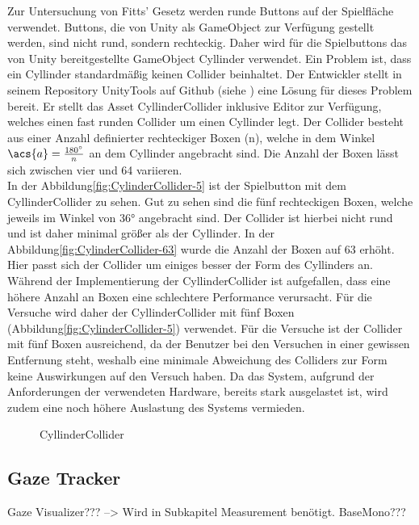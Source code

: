 Zur Untersuchung von Fitts' Gesetz werden runde Buttons auf der Spielfläche verwendet. Buttons, die von Unity als GameObject zur Verfügung gestellt werden, sind nicht rund, sondern rechteckig. Daher wird für die Spielbuttons das von Unity bereitgestellte GameObject {\ttfamily Cyllinder} verwendet. Ein Problem ist, dass ein Cyllinder standardmäßig keinen Collider beinhaltet. Der Entwickler \citeauthor{kode80.2016} stellt in seinem Repository UnityTools auf Github (siehe \cite{kode80.2016}) eine Lösung für dieses Problem bereit. Er stellt das Asset {\ttfamily CyllinderCollider} inklusive Editor zur Verfügung, welches einen fast runden Collider um einen Cyllinder legt. Der Collider besteht aus einer Anzahl definierter rechteckiger Boxen (n), welche in dem Winkel $\acs{a} = \frac{180^\circ}{n}$ an dem Cyllinder angebracht sind. Die Anzahl der Boxen lässt sich zwischen vier und 64 variieren.\\
In der Abbildung\autoref{fig:CylinderCollider-5} ist der Spielbutton mit dem CyllinderCollider zu sehen. Gut zu sehen sind die fünf rechteckigen Boxen, welche jeweils im Winkel von 36° angebracht sind. Der Collider ist hierbei nicht rund und ist daher minimal größer als der Cyllinder. In der Abbildung\autoref{fig:CylinderCollider-63} wurde die Anzahl der Boxen auf 63 erhöht. Hier passt sich der Collider um einiges besser der Form des Cyllinders an. Während der Implementierung der CyllinderCollider ist aufgefallen, dass eine höhere Anzahl an Boxen eine schlechtere Performance verursacht. Für die Versuche wird daher der CyllinderCollider mit fünf Boxen (Abbildung\autoref{fig:CylinderCollider-5}) verwendet. Für die Versuche ist der Collider mit fünf Boxen ausreichend, da der Benutzer bei den Versuchen in einer gewissen Entfernung steht, weshalb eine minimale Abweichung des Colliders zur Form keine Auswirkungen auf den Versuch haben. Da das System, aufgrund der Anforderungen der verwendeten Hardware, bereits stark ausgelastet ist, wird zudem eine noch höhere Auslastung des Systems vermieden.

\begin{figure}[!htbp]
	\centering
	\qquad      
	\caption{CyllinderCollider}
	\label{fig:CylinderCollider}
\end{figure}  

\subsection{Gaze Tracker}
Gaze Visualizer??? --> Wird in Subkapitel Measurement benötigt.
BaseMono???

